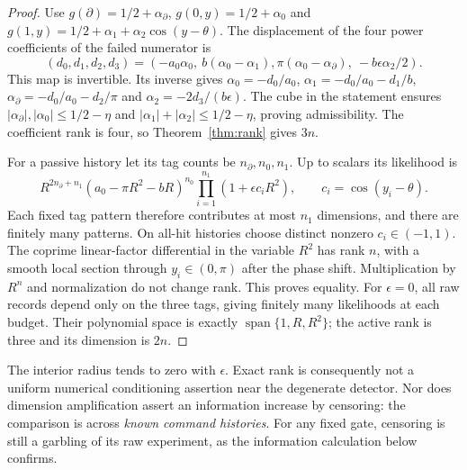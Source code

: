 \begin{proof}
Use $g(\partial)=1/2+\alpha_\partial$, $g(0,y)=1/2+\alpha_0$ and
$g(1,y)=1/2+\alpha_1+\alpha_2\cos(y-\theta)$. The displacement of the four power coefficients of the failed numerator is
\[
 (d_0,d_1,d_2,d_3)=(-a_0\alpha_0,\ b(\alpha_0-\alpha_1),
 \pi(\alpha_0-\alpha_\partial),\ -b\epsilon\alpha_2/2).
\]
This map is invertible. Its inverse gives
$\alpha_0=-d_0/a_0$, $\alpha_1=-d_0/a_0-d_1/b$,
$\alpha_\partial=-d_0/a_0-d_2/\pi$ and $\alpha_2=-2d_3/(b\epsilon)$.
The cube in the statement ensures $|\alpha_\partial|,|\alpha_0|\le1/2-\eta$ and $|\alpha_1|+|\alpha_2|\le1/2-\eta$, proving admissibility. The coefficient rank is four, so Theorem~\ref{thm:rank} gives $3n$.

For a passive history let its tag counts be $n_\partial,n_0,n_1$. Up to scalars its likelihood is
\[
 R^{2n_\partial+n_1}(a_0-\pi R^2-bR)^{n_0}
 \prod_{i=1}^{n_1}(1+\epsilon c_iR^2),\qquad c_i=\cos(y_i-\theta).
\]
Each fixed tag pattern therefore contributes at most $n_1$ dimensions, and there are finitely many patterns. On all-hit histories choose distinct nonzero $c_i\in(-1,1)$. The coprime linear-factor differential in the variable $R^2$ has rank $n$, with a smooth local section through $y_i\in(0,\pi)$ after the phase shift. Multiplication by $R^n$ and normalization do not change rank. This proves equality. For $\epsilon=0$, all raw records depend only on the three tags, giving finitely many likelihoods at each budget. Their polynomial space is exactly $\operatorname{span}\{1,R,R^2\}$; the active rank is three and its dimension is $2n$.
\end{proof}

The interior radius tends to zero with $\epsilon$. Exact rank is consequently not a uniform numerical conditioning assertion near the degenerate detector. Nor does dimension amplification assert an information increase by censoring: the comparison is across \emph{known command histories}. For any fixed gate, censoring is still a garbling of its raw experiment, as the information calculation below confirms.
